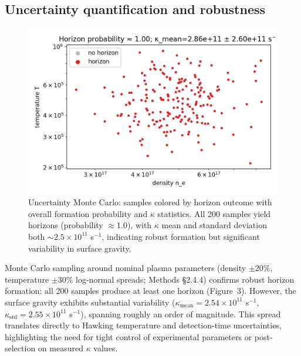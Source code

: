 \documentclass[11pt]{article}
\begin{document}
\subsection{Uncertainty quantification and robustness}
\begin{figure}[h]
  \centering
  \includegraphics[width=0.75\linewidth]{figures/horizon_probability_bands.png}
  \caption{Uncertainty Monte Carlo: samples colored by horizon outcome with overall formation probability and $\kappa$ statistics. All 200 samples yield horizons (probability $\approx 1.0$), with $\kappa$ mean and standard deviation both $\sim 2.5 \times 10^{11}$ s$^{-1}$, indicating robust formation but significant variability in surface gravity.}
\end{figure}

Monte Carlo sampling around nominal plasma parameters (density $\pm$20\%, temperature $\pm$30\% log-normal spreads; Methods §2.4.4) confirms robust horizon formation: all 200 samples produce at least one horizon (Figure~3). However, the surface gravity exhibits substantial variability ($\kappa_{\text{mean}} = 2.54 \times 10^{11}$ s$^{-1}$, $\kappa_{\text{std}} = 2.55 \times 10^{11}$ s$^{-1}$), spanning roughly an order of magnitude. This spread translates directly to Hawking temperature and detection-time uncertainties, highlighting the need for tight control of experimental parameters or post-selection on measured $\kappa$ values.
\end{document}
